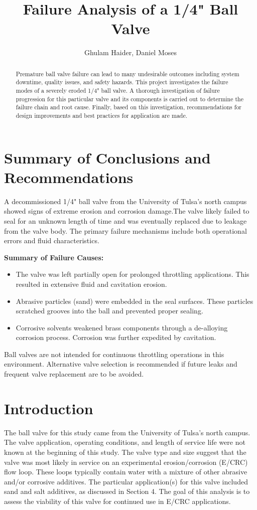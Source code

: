 \documentclass[]{article}
\title{Failure Analysis of a 1/4" Ball Valve}
\author{Ghulam Haider, Daniel Moses}
\begin{document}
\maketitle

\begin{abstract}
	
	Premature ball valve failure can lead to many undesirable outcomes including system downtime, quality issues, and safety hazards. This project investigates the failure modes of a severely eroded 1/4" ball valve. A thorough investigation of failure progression for this particular valve and its components is carried out to determine the failure chain and root cause. Finally, based on this investigation, recommendations for design improvements and best practices for application are made.
	

\end{abstract}
\tableofcontents
\pagebreak
\section{Summary of Conclusions and Recommendations}
A decommissioned 1/4" ball valve from the University of Tulsa’s north campus showed signs of extreme erosion and corrosion damage.The valve likely failed to seal for an unknown length of time and was eventually replaced due to leakage from the valve body. The primary failure mechanisms include both operational errors and fluid characteristics.

\textbf{Summary of Failure Causes:}
\begin{itemize}
	\item The valve was left partially open for prolonged throttling applications. This resulted in extensive fluid and cavitation erosion. 
	\item Abrasive particles (sand) were embedded in the seal surfaces. These particles scratched grooves into the ball and prevented proper sealing.
	\item Corrosive solvents weakened brass components through a de-alloying corrosion process. Corrosion was further expedited by cavitation.
\end{itemize}

Ball valves are not intended for continuous throttling operations in this environment. Alternative valve selection is recommended if future leaks and frequent valve replacement are to be avoided.

\section{Introduction}
The ball valve for this study came from the University of Tulsa's north campus. The valve application, operating conditions, and length of service life were not known at the beginning of this study. The valve type and size suggest that the valve was most likely in service on an experimental erosion/corrosion (E/CRC) flow loop. These loops typically contain water with a mixture of other abrasive and/or corrosive additives. The particular application(s) for this valve included sand and salt additives, as discussed in Section 4. The goal of this analysis is to assess the viability of this valve for continued use in E/CRC applications. 
\end{document}
